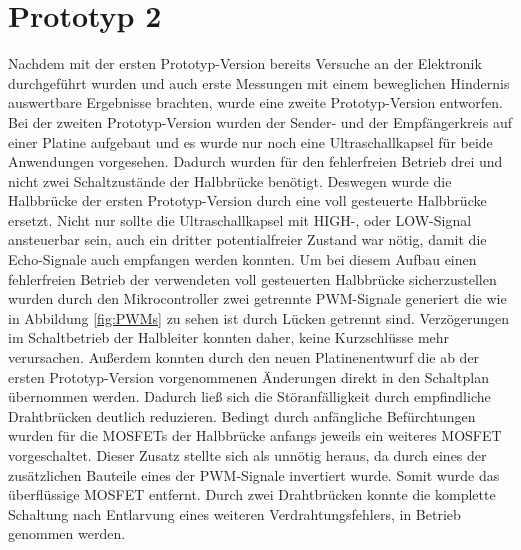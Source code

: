 \section{Prototyp 2}
Nachdem mit der ersten Prototyp-Version bereits Versuche an der Elektronik durchgeführt wurden und auch erste Messungen mit einem beweglichen Hindernis auswertbare Ergebnisse brachten, wurde eine zweite Prototyp-Version entworfen. Bei der zweiten Prototyp-Version wurden der Sender- und der Empfängerkreis auf einer Platine aufgebaut und es wurde nur noch eine Ultraschallkapsel für beide Anwendungen vorgesehen. Dadurch wurden für den fehlerfreien Betrieb drei und nicht zwei Schaltzustände der Halbbrücke benötigt. Deswegen wurde die Halbbrücke der ersten Prototyp-Version durch eine voll gesteuerte Halbbrücke ersetzt. Nicht nur sollte die Ultraschallkapsel mit HIGH-, oder LOW-Signal ansteuerbar sein, auch ein dritter potentialfreier Zustand war nötig, damit die Echo-Signale auch empfangen werden konnten. Um bei diesem Aufbau einen fehlerfreien Betrieb der verwendeten voll gesteuerten Halbbrücke sicherzustellen wurden durch den Mikrocontroller zwei getrennte PWM-Signale generiert die wie in Abbildung \ref{fig:PWMs} zu sehen ist durch Lücken getrennt sind. Verzögerungen im Schaltbetrieb der Halbleiter konnten daher, keine Kurzschlüsse mehr verursachen. Außerdem konnten durch den neuen Platinenentwurf die ab der ersten Prototyp-Version vorgenommenen Änderungen direkt in den Schaltplan übernommen werden. Dadurch ließ sich die Störanfälligkeit durch empfindliche Drahtbrücken deutlich reduzieren. Bedingt durch anfängliche Befürchtungen wurden für die MOSFETs der Halbbrücke anfangs jeweils ein weiteres MOSFET vorgeschaltet. Dieser Zusatz stellte sich als unnötig heraus, da durch eines der zusätzlichen Bauteile eines der PWM-Signale invertiert wurde. Somit wurde das überflüssige MOSFET entfernt. Durch zwei Drahtbrücken konnte die komplette Schaltung nach Entlarvung eines weiteren Verdrahtungsfehlers, in Betrieb genommen werden.\\
